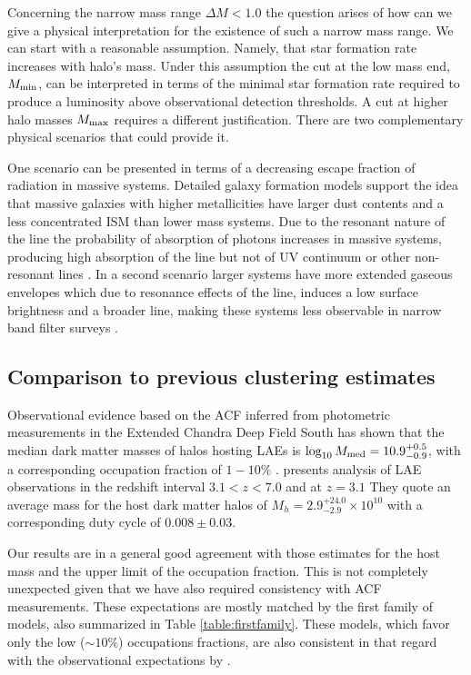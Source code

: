 \documentclass{emulateapj}
\newcommand{\ly}{{\ifmmode{{\rm Ly}\alpha}\else{Ly$\alpha$~}\fi}}
\newcommand{\hMsun}{{\ifmmode{h^{-1}{\rm
        {M_{\odot}}}}\else{$h^{-1}{\rm{M_{\odot}}}$}\fi}}
\newcommand{\Msun}{{\ifmmode{{\rm {M_{\odot}}}}\else{${\rm{M_{\odot}}}$}\fi}}
\begin{document}
Concerning the narrow mass range $\Delta M
  <1.0$ the question arises of how can we give a physical
  interpretation for the existence of such  a narrow mass range. We
  can start with a reasonable   assumption. Namely, that star formation
  rate increases with halo's  mass. Under this assumption the cut at
  the low mass end, $M_{\rm min}$, can be interpreted in terms of the
  minimal star formation rate required to produce a \ly luminosity
  above observational detection thresholds.   A cut at higher halo
  masses $M_{\rm  max}$ requires a different justification. There are
  two complementary physical scenarios that could provide it.

One scenario can be presented in terms of a decreasing escape fraction
of \ly radiation in massive systems. Detailed galaxy formation models
support the idea that massive galaxies with higher metallicities have
larger dust contents and a less concentrated ISM than lower mass
systems. Due to the resonant nature of the \ly line the probability of
absorption  of \ly photons increases in massive systems, producing
high absorption of the \ly line but not of UV continuum or other
non-resonant lines \citep{Laursen2009,ForeroRomero2011}. In a second
scenario larger systems have more extended gaseous envelopes which due
to resonance effects of the \ly line, induces a low surface brightness
and a broader line, making these systems less observable in narrow
band filter surveys \citep{Laursen2009,Zheng2010}.    


\subsection{Comparison to previous clustering estimates}

Observational evidence based on the ACF inferred from photometric
measurements in the Extended Chandra Deep Field South has shown that
the median dark matter masses of halos hosting LAEs is
$\log_{10}M_{\rm  med}=10.9^{+0.5}_{-0.9}$\Msun, with a corresponding
occupation fraction of $1-10\%$  \citep{Gawiser07}.  \cite{Ouchi2010}
presents analysis of LAE observations in the redshift interval
$3.1<z<7.0$ and at $z=3.1$ They quote an average mass for the host
dark matter halos of $M_{h}=2.9^{+24.0}_{-2.9}\times 10^{10}$ \hMsun
with a corresponding duty cycle of $0.008\pm 0.03$.  

Our results are in a general good agreement with those estimates for
the host mass and the upper limit of the occupation fraction. This is
not completely unexpected given that we have also required consistency
with ACF measurements. These expectations are mostly matched by
the first family of models, also summarized in Table
\ref{table:firstfamily}. These models, which favor only the  low
($\sim 10\%$) occupations fractions, are also consistent in that
regard with the observational expectations by \cite{Gawiser07}. 
\end{document}
